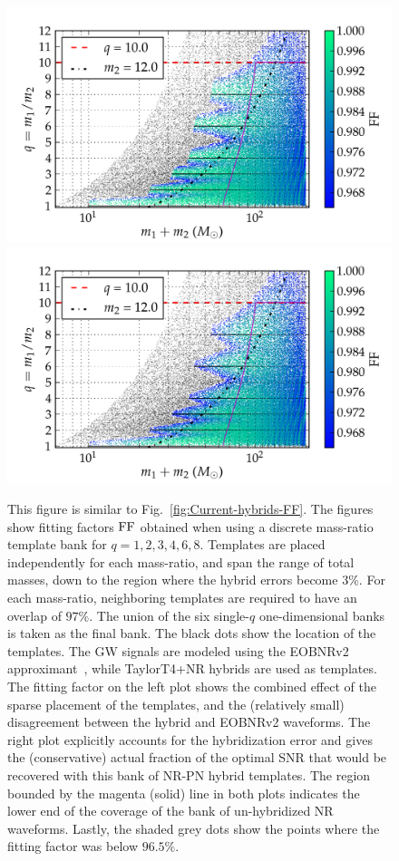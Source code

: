 \begin{figure}
\begin{center}
\includegraphics[width=\columnwidth]{bank_26022013_02_hybrids_mtot200_logMq_NOhybMM.png}
\includegraphics[width=\columnwidth]{bank_26022013_02_hybrids_mtot200_logMq_hybMM.png}
\caption{\label{fig:Current-real-hybrids-FF}This figure is similar to 
  Fig.~\ref{fig:Current-hybrids-FF}. The figures show fitting
  factors $\mathrm{FF}$ obtained when using a discrete mass-ratio template bank for
  $q=1,2,3,4,6,8$. Templates are placed independently for each mass-ratio, and 
  span the range of total masses, down to the region where the hybrid errors
  become $3\%$. For each mass-ratio, neighboring templates are 
  required to have an overlap of $97\%$. The union of the six single-$q$ 
  one-dimensional banks is taken as the final bank. The black dots show the 
  location of the templates. The GW signals are modeled using the EOBNRv2
  approximant~\cite{BuonannoEOBv2Main}, while TaylorT4+NR hybrids are used as
  templates. The fitting factor on the left plot shows the combined effect of 
  the sparse placement of the templates, and the (relatively small) 
  disagreement between the hybrid and EOBNRv2 waveforms. The right plot
  explicitly accounts for the hybridization error and gives the (conservative)
  actual fraction of the optimal SNR that would be recovered
  with this bank of NR-PN hybrid templates. The region bounded by the magenta 
  (solid) line in both plots indicates the lower end of the coverage of the 
  bank of un-hybridized NR waveforms. Lastly, the shaded grey dots show the 
  points where the fitting factor was below $96.5\%$.  }
\end{center}
\end{figure}

